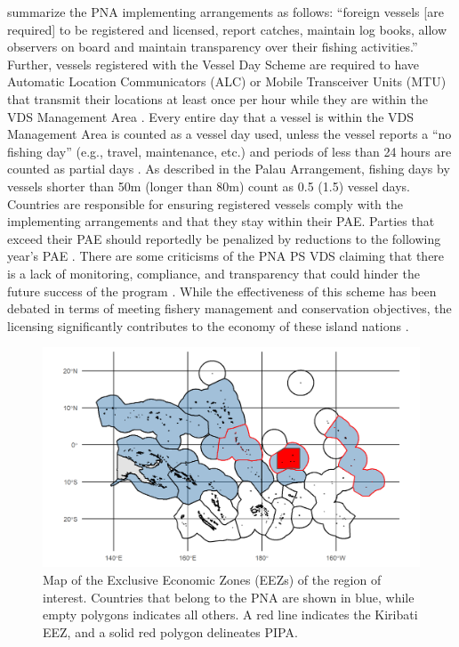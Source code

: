 \documentclass[9pt,twoside,lineno]{pnas-new}
\begin{document}
\cite{yeeting2018stabilising} summarize the PNA implementing arrangements as follows: “foreign vessels [are required] to be registered and licensed, report catches, maintain log books, allow observers on board and maintain transparency over their fishing activities.” Further, vessels registered with the Vessel Day Scheme are required to have Automatic Location Communicators (ALC) or Mobile Transceiver Units (MTU) that transmit their locations at least once per hour while they are within the VDS Management Area \citep{PNA2016}. Every entire day that a vessel is within the VDS Management Area is counted as a vessel day used, unless the vessel reports a “no fishing day” (e.g., travel, maintenance, etc.) and periods of less than 24 hours are counted as partial days \citep{PNA2016}.  As described in the Palau Arrangement, fishing days by vessels shorter than 50m (longer than 80m) count as 0.5 (1.5) vessel days. Countries are responsible for ensuring registered vessels comply with the implementing arrangements and that they stay within their PAE. Parties that exceed their PAE should reportedly be penalized by reductions to the following year’s PAE \citep{PNA2016}. There are some criticisms of the PNA PS VDS claiming that there is a lack of monitoring, compliance, and transparency that could hinder the future success of the program \citep{Arnason2014,yeeting2018stabilising}. While the effectiveness of this scheme has been
debated in terms of meeting fishery management and conservation
objectives, the licensing significantly contributes to the economy of
these island nations \citep{havice_2010}.

\begin{figure}
\centering
\includegraphics{img/PNA_map.png}
\caption{\label{fig:PNA_map}Map of the Exclusive
Economic Zones (EEZs) of the region of interest. Countries that belong
to the PNA are shown in blue, while empty polygons indicates all others.
A red line indicates the Kiribati EEZ, and a solid red polygon
delineates PIPA.}
\end{figure}
\end{document}
